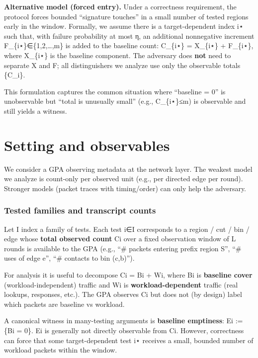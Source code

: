 \documentclass[
 11pt,
]{article}
\begin{document}
\textbf{Alternative model (forced entry).} Under a correctness
requirement, the protocol forces bounded ``signature touches'' in a
small number of tested regions early in the window. Formally, we assume
there is a target-dependent index i⋆ such that, with failure probability
at most η, an additional nonnegative increment
F\_\{i⋆\}∈\{1,2,\ldots,m\} is added to the baseline count: C\_\{i⋆\} =
X\_\{i⋆\} + F\_\{i⋆\}, where X\_\{i⋆\} is the baseline component. The
adversary does \textbf{not} need to separate X and F; all distinguishers
we analyze use only the observable totals \{C\_i\}.

This formulation captures the common situation where ``baseline = 0'' is
unobservable but ``total is unusually small'' (e.g., C\_\{i⋆\}≤m) is
observable and still yields a witness.

\section{Setting and observables}\label{setting-and-observables}

We consider a GPA observing metadata at the network layer. The weakest
model we analyze is count-only per observed unit (e.g., per directed
edge per round). Stronger models (packet traces with timing/order) can
only help the adversary.

\subsubsection{Tested families and transcript
counts}\label{tested-families-and-transcript-counts}

Let I index a family of tests. Each test i∈I corresponds to a region /
cut / bin / edge whose \textbf{total observed count} Ci over a fixed
observation window of L rounds is available to the GPA (e.g., ``\#
packets entering prefix region S'', ``\# uses of edge e'', ``\# contacts
to bin (c,b)'').

For analysis it is useful to decompose Ci = Bi + Wi, where Bi is
\textbf{baseline cover} (workload-independent) traffic and Wi is
\textbf{workload-dependent} traffic (real lookups, responses, etc.). The
GPA observes Ci but does not (by design) label which packets are
baseline vs workload.

A canonical witness in many-testing arguments is \textbf{baseline
emptiness}: Ei := \{Bi = 0\}. Ei is generally not directly observable
from Ci. However, correctness can force that some target-dependent test
i⋆ receives a small, bounded number of workload packets within the
window.
\end{document}
